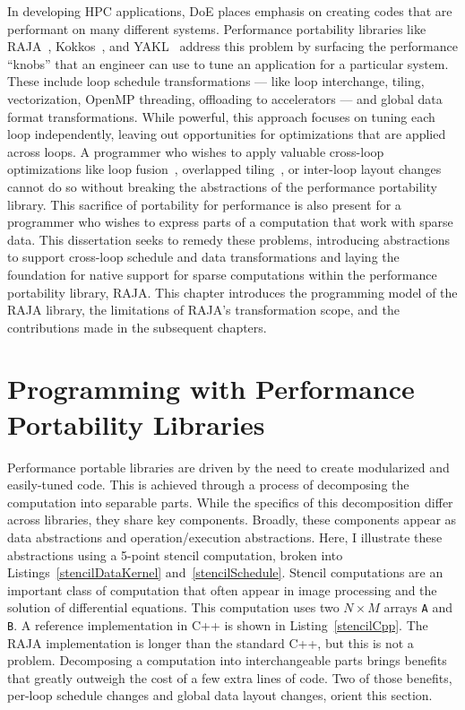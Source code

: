 In developing HPC applications, DoE places emphasis on creating codes that are performant on many different systems.
Performance portability libraries like RAJA~\cite{hornung2014RAJA}, Kokkos~\cite{edwards2014kokkos}, and YAKL~\cite{norman2022portable} address this problem by surfacing the performance ``knobs'' that an engineer can use to tune an application for a particular system. 
These include loop schedule transformations --- like loop interchange, tiling, vectorization, OpenMP threading, offloading to accelerators --- and global data format transformations.
While powerful, this approach focuses on tuning each loop independently, leaving out opportunities for optimizations that are applied across loops.
A programmer who wishes to apply valuable cross-loop optimizations like loop fusion~\cite{mckinley1996improving}, overlapped tiling~\cite{bertolacci2019using,zhou2012hierarchical,CathieSC14}, or inter-loop layout changes~\cite{kennedy1995automatic,kennedy1998automatic} cannot do so without breaking the abstractions of the performance portability library.
This sacrifice of portability for performance is also present for a programmer who wishes to express parts of a computation that work with sparse data.
This dissertation seeks to remedy these problems, introducing abstractions to support cross-loop schedule and data transformations and laying the foundation for native support for sparse computations within the performance portability library, RAJA\@.
This chapter introduces the programming model of the RAJA library, the limitations of RAJA's transformation scope, and the contributions made in the subsequent chapters. 

\section{Programming with Performance Portability Libraries}

Performance portable libraries are driven by the need to create modularized and easily-tuned code.
This is achieved through a process of decomposing the computation into separable parts.
While the specifics of this decomposition differ across libraries, they share key components.
Broadly, these components appear as data abstractions and operation/execution abstractions.
Here, I illustrate these abstractions using a 5-point stencil computation, broken into Listings~\ref{stencilDataKernel} and~\ref{stencilSchedule}.
Stencil computations are an important class of computation that often appear in image processing and the solution of differential equations.
This computation uses two $N \times M$ arrays \verb.A. and \verb.B..
A reference implementation in C++ is shown in Listing~\ref{stencilCpp}.
The RAJA implementation is longer than the standard C++, but this is not a problem.
Decomposing a computation into interchangeable parts brings benefits that greatly outweigh the cost of a few extra lines of code.
Two of those benefits, per-loop schedule changes and global data layout changes, orient this section.

